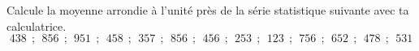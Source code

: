 
Calcule la moyenne arrondie à l'unité près de la série statistique suivante avec ta calculatrice.
$$ 438 ~~;~~ 856~~;~~ 951~~;~~ 458~~;~~ 357~~;~~ 856~~;~~ 456~~;~~ 253~~;~~ 123~~;~~ 756~~;~~ 652~~;~~ 478~~;~~ 531$$